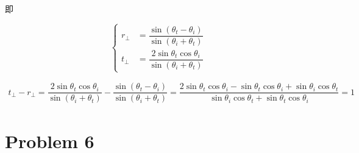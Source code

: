 \documentclass{article}
\begin{document}
即

\begin{equation*}
  \left\{
  \begin{aligned}
    r_{\perp} &= \dfrac{\sin \left( \theta_t - \theta_i \right)}{\sin \left( \theta_i + \theta_t \right)} \\
    t_{\perp} &= \dfrac{2 \sin \theta_t \cos \theta_i}{\sin \left( \theta_i + \theta_t \right)} 
  \end{aligned}
  \right.
\end{equation*}

\begin{equation*}
  \begin{aligned}
    t_{\perp} - r_{\perp} = \dfrac{2 \sin \theta_t \cos \theta_i}{\sin \left( \theta_i + \theta_t \right)} - \dfrac{\sin \left( \theta_t - \theta_i \right)}{\sin \left( \theta_i + \theta_t \right)} = \dfrac{2 \sin \theta_t \cos \theta_i - \sin \theta_t \cos \theta_i + \sin \theta_i \cos \theta_t}{\sin \theta_i \cos \theta_t + \sin \theta_t \cos \theta_i} = 1
  \end{aligned}
\end{equation*}

\section{Problem 6}
\end{document}

